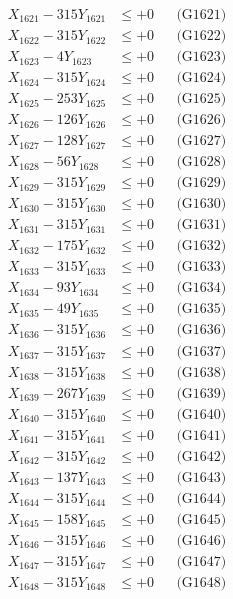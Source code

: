 \documentclass[a4paper,10pt]{article}
\begin{document}
{\begin{align}
\allowbreak
X_{1621} - 315Y_{1621} &\leq +0 && \text{(G1621)} \\
X_{1622} - 315Y_{1622} &\leq +0 && \text{(G1622)} \\
X_{1623} - 4Y_{1623} &\leq +0 && \text{(G1623)} \\
X_{1624} - 315Y_{1624} &\leq +0 && \text{(G1624)} \\
X_{1625} - 253Y_{1625} &\leq +0 && \text{(G1625)} \\
X_{1626} - 126Y_{1626} &\leq +0 && \text{(G1626)} \\
X_{1627} - 128Y_{1627} &\leq +0 && \text{(G1627)} \\
X_{1628} - 56Y_{1628} &\leq +0 && \text{(G1628)} \\
X_{1629} - 315Y_{1629} &\leq +0 && \text{(G1629)} \\
X_{1630} - 315Y_{1630} &\leq +0 && \text{(G1630)} \\
\allowbreak
X_{1631} - 315Y_{1631} &\leq +0 && \text{(G1631)} \\
X_{1632} - 175Y_{1632} &\leq +0 && \text{(G1632)} \\
X_{1633} - 315Y_{1633} &\leq +0 && \text{(G1633)} \\
X_{1634} - 93Y_{1634} &\leq +0 && \text{(G1634)} \\
X_{1635} - 49Y_{1635} &\leq +0 && \text{(G1635)} \\
X_{1636} - 315Y_{1636} &\leq +0 && \text{(G1636)} \\
X_{1637} - 315Y_{1637} &\leq +0 && \text{(G1637)} \\
X_{1638} - 315Y_{1638} &\leq +0 && \text{(G1638)} \\
X_{1639} - 267Y_{1639} &\leq +0 && \text{(G1639)} \\
X_{1640} - 315Y_{1640} &\leq +0 && \text{(G1640)} \\
\allowbreak
X_{1641} - 315Y_{1641} &\leq +0 && \text{(G1641)} \\
X_{1642} - 315Y_{1642} &\leq +0 && \text{(G1642)} \\
X_{1643} - 137Y_{1643} &\leq +0 && \text{(G1643)} \\
X_{1644} - 315Y_{1644} &\leq +0 && \text{(G1644)} \\
X_{1645} - 158Y_{1645} &\leq +0 && \text{(G1645)} \\
X_{1646} - 315Y_{1646} &\leq +0 && \text{(G1646)} \\
X_{1647} - 315Y_{1647} &\leq +0 && \text{(G1647)} \\
X_{1648} - 315Y_{1648} &\leq +0 && \text{(G1648)} \\

\end{align}}
\end{document}

